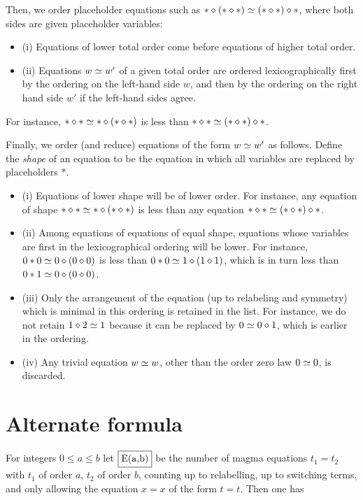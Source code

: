 Then, we order placeholder equations such as $\ast \diamond (\ast \diamond \ast) \simeq (\ast \diamond \ast) \diamond \ast$, where both sides are given placeholder variables:
\begin{itemize}
\item (i)  Equations of lower total order come before equations of higher total order.
\item (ii) Equations $w \simeq w'$ of a given total order are ordered lexicographically first by the ordering on the left-hand side $w$, and then by the ordering on the right hand side $w'$ if the left-hand sides agree.
\end{itemize}
For instance, $\ast \diamond \ast \simeq \ast \diamond (\ast \diamond \ast)$ is less than $\ast \diamond \ast \simeq (\ast \diamond \ast) \diamond \ast$.

Finally, we order (and reduce) equations of the form $w \simeq w'$ as follows. Define the \emph{shape} of an equation to be the equation in which all variables are replaced by placeholders $\ast$.
\begin{itemize}
  \item (i) Equations of lower shape will be of lower order.  For instance, any equation of shape $\ast \diamond \ast \simeq \ast \diamond (\ast \diamond \ast)$ is less than any equation $\ast \diamond \ast \simeq (\ast \diamond \ast) \diamond \ast$.
  \item (ii) Among equations of equations of equal shape, equations whose variables are first in the lexicographical ordering will be lower. For instance, $0 \ast 0 \simeq 0 \diamond (0 \diamond 0)$ is less than $0 \ast 0 \simeq 1 \diamond (1 \diamond 1)$, which is in turn less than $0 \ast 1 \simeq 0 \diamond (0 \diamond 0)$.
  \item (iii) Only the arrangement of the equation (up to relabeling and symmetry) which is minimal in this ordering is retained in the list.  For instance, we do not retain $1 \diamond 2 \simeq 1$ because it can be replaced by $0 \simeq 0 \diamond 1$, which is earlier in the ordering.
\item (iv) Any trivial equation $w \simeq w$, other than the order zero law $0 \simeq 0$, is discarded.
\end{itemize}

\section{Alternate formula}

For integers $0 \le a \le b$ let $\fbox{E(a,b)}$ be the number of magma equations $t_1 = t_2$ with $t_1$ of order $a$, $t_2$ of order $b$, counting up to relabelling, up to switching terms, and only allowing the equation $x=x$ of the form $t=t$.  Then one has

